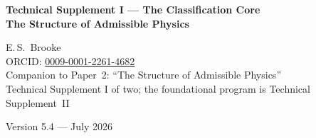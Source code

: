 \documentclass[11pt]{article}
\date{Version 5.4 --- July 2026}
\theoremstyle{definition}
\begin{document}
\begin{center}
{\LARGE\bfseries Technical Supplement I --- The Classification Core\\[4pt]
The Structure of Admissible Physics}

\bigskip
{\large E.\,S.\ Brooke}\\[2pt]
{\small ORCID: \href{https://orcid.org/0009-0001-2261-4682}{0009-0001-2261-4682}}\\[4pt]
{\small Companion to Paper~2: ``The Structure of Admissible Physics''\\
Technical Supplement I of two; the foundational program is Technical Supplement~II}

\bigskip
{\small Version 5.4 --- July 2026}
\end{center}

\bigskip
\end{document}
